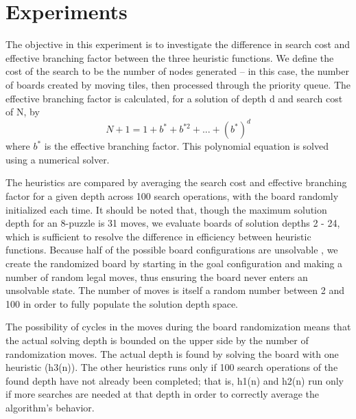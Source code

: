 
\section{Experiments}
\label{sec:expts}

The objective in this experiment is to investigate the difference in search cost and effective branching factor between the three heuristic functions.  We define the cost of the search to be the number of nodes generated -- in this case, the number of boards created by moving tiles, then processed through the priority queue.  The effective branching factor is calculated, for a solution of depth d and search cost of N, by 
$$ N + 1 = 1 + b^* + b^{*2} + ... + (b^*)^d $$
where $b^*$ is the effective branching factor.  This polynomial equation is solved using a numerical solver. 

The heuristics are compared by averaging the search cost and effective branching factor for a given depth across 100 search operations, with the board randomly initialized each time.  It should be noted that, though the maximum solution depth for an 8-puzzle is 31 moves, we evaluate boards of solution depths 2 - 24, which is sufficient to resolve the difference in efficiency between heuristic functions.  Because half of the possible board configurations are unsolvable \cite{15notes}, we create the randomized board by starting in the goal configuration and making a number of random legal moves, thus ensuring the board never enters an unsolvable state.  The number of moves is itself a random number between 2 and 100 in order to fully populate the solution depth space. 

The possibility of cycles in the moves during the board randomization means that the actual solving depth is bounded on the upper side by the number of randomization moves.  The actual depth is found by solving the board with one heuristic (h3(n)).  The other heuristics runs only if 100 search operations of the found depth have not already been completed; that is, h1(n) and h2(n) run only if more searches are needed at that depth in order to correctly average the algorithm's behavior. 

